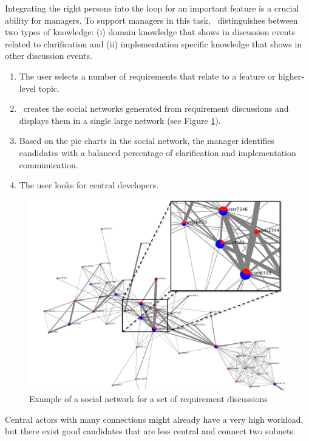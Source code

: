 Integrating the right persons into the loop for an important feature is a crucial ability for managers.
To support managers in this task, \viss\ distinguishes between two types of knowledge: (i) domain knowledge that shows in discussion events related to clarification and (ii) implementation specific knowledge that shows in other discussion events.
\begin{enumerate}
\item The user selects a number of requirements that relate to a feature or higher-level topic. 
\item \viss\ creates the social networks generated from requirement discussions and displays them in a single large network (see Figure \ref{fig:example-sn-large}).
\item Based on the pie charts in the social network, the manager identifies candidates with a balanced percentage of clarification and implementation communication.
\item The user looks for central developers. 
\end{enumerate}
\begin{figure}
\centering
\includegraphics[width=0.8\columnwidth]{img/example-sn-large}
\caption{Example of a social network for a set of requirement discussions}
\label{fig:example-sn-large}
\end{figure}
Central actors with many connections might already have a very high workload, but there exist good candidates that are less central and connect two subnets.
